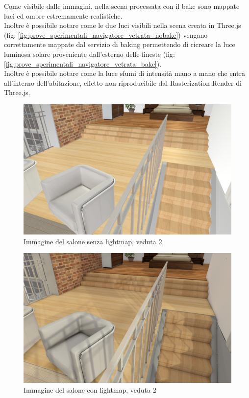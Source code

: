 Come visibile dalle immagini, nella scena processata con il bake sono mappate luci ed ombre estremamente realistiche.  
\\
Inoltre è possibile notare come le due luci visibili nella scena creata in Three.js (fig: \ref{fig:prove_sperimentali_navigatore_vetrata_nobake}) vengano correttamente mappate dal servizio di baking permettendo di ricreare la luce luminosa solare proveniente dall’esterno delle fineste (fig:\ref{fig:prove_sperimentali_navigatore_vetrata_bake}).
\\
Inoltre è possibile notare come la luce sfumi di intensità mano a mano che entra all’interno dell’abitazione, effetto non riproducibile dal Rasterization Render di Three.js.
\begin{figure}[htb]
 \centering
 \includegraphics[width=1\linewidth]{images/chapter_prove_sperimentali/salone_scale_nobake.png}\hfill
 \caption[Salone senza lightmap, veduta 2]{Immagine del salone senza lightmap, veduta 2}
 \label{fig:prove_sperimentali_navigatore_scale_nobake}
\end{figure}
\begin{figure}[htb]
 \centering
 \includegraphics[width=1\linewidth]{images/chapter_prove_sperimentali/salone_scale_bake.png}\hfill
 \caption[Salone con lightmap, veduta 2]{Immagine del salone con lightmap, veduta 2}
 \label{fig:prove_sperimentali_navigatore_scale_bake}
\end{figure}
